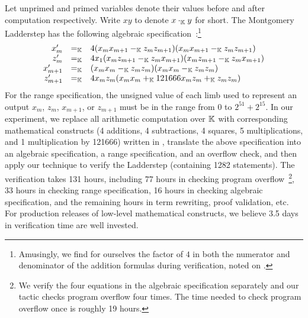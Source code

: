 Let unprimed and primed variables denote their values before and after
computation respectively.
Write $x y$ to denote $x \cdot_{\mathbb{K}} y$ for short.
The Montgomery Ladderstep has the following algebraic
specification~\cite{M:87:SPEC}:\footnote{Amusingly, we find for
  ourselves the factor of $4$ in both the numerator and denominator of
  the addition formulas during verification, noted on
  \cite[p.~261]{M:87:SPEC}.}
\[
  \begin{array}{rcl}
  x'_{m} & =_{\mathbb{K}} & 4 (x_m x_{m+1} -_{\mathbb{K}} z_m z_{m+1}) (x_m x_{m+1} -_{\mathbb{K}} z_m z_{m+1}) \\
  z'_{m} & =_{\mathbb{K}} & 4 x_1 (x_m z_{m+1} -_{\mathbb{K}} z_m x_{m+1}) (x_m z_{m+1} -_{\mathbb{K}} z_m x_{m+1}) \\
  x'_{m+1} & =_{\mathbb{K}} & (x_m x_m -_{\mathbb{K}} z_m z_m) (x_m x_m -_{\mathbb{K}} z_m z_m) \\
  z'_{m+1} & =_{\mathbb{K}} & 4 x_m z_m (x_m x_m +_{\mathbb{K}} 121666 x_m z_m +_{\mathbb{K}} z_m z_m)
\end{array}
\]
For the range specification, the unsigned value of each limb used to represent an output $x_m$, $z_m$, $x_{m+1}$, or $z_{m+1}$ must be in the range from $0$ to $2^{51}+2^{15}$.
In our experiment, we replace all arithmetic computation over $\mathbb{K}$
with corresponding mathematical constructs (4 additions, 4 subtractions, 4 squares, 5
multiplications, and 1 multiplication by 121666) written in \bvdsl,
translate the above specification into an algebraic specification, a range specification, and an overflow check, and then apply our technique to verify the Ladderstep (containing 1282 statements).
The verification takes 131 hours, including 77 hours in checking program overflow~\footnote{We verify the four equations in the algebraic specification separately and our \coq tactic checks program overflow four times. The time needed to check program overflow once is roughly 19 hours.}, 33 hours in checking range specification, 16 hours in checking algebraic specification, and the remaining hours in term rewriting, proof validation, etc.
For production releases of low-level
mathematical constructs, we believe 3.5 days in verification time are
well invested.



